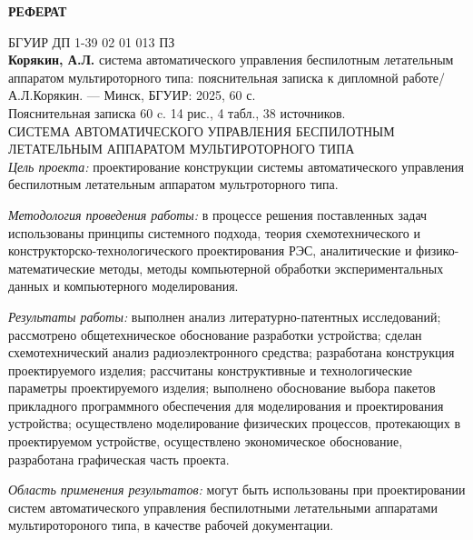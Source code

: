 \thispagestyle{empty} %

\begin{center}  
\textbf{РЕФЕРАТ}
\end{center}

БГУИР ДП 1-39 02 01 013 ПЗ
\\[14pt]
\textbf{Корякин, А.Л.} система автоматического управления
беспилотным летательным аппаратом мультироторного типа:
пояснительная записка к дипломной работе/А.Л.Корякин.
— Минск, БГУИР: 2025, 60 с.
\\[14pt]
Пояснительная записка 60 c. 14 рис., 4 табл., 38 источников.
\\[14pt]
СИСТЕМА АВТОМАТИЧЕСКОГО УПРАВЛЕНИЯ БЕСПИЛОТНЫМ ЛЕТАТЕЛЬНЫМ АППАРАТОМ
МУЛЬТИРОТОРНОГО ТИПА
\\[14pt]
\textit{Цель проекта:} проектирование конструкции
системы автоматического управления беспилотным летательным аппаратом
мультроторного типа.

\textit{Методология проведения работы:}
в процессе решения поставленных задач использованы принципы системного
подхода, теория схемотехнического и конструкторско-технологического
проектирования РЭС, аналитические и физико-математические методы,
методы компьютерной обработки экспериментальных данных и компьютерного
моделирования.

\textit{Результаты работы:}
выполнен анализ литературно-патентных исследований; рассмотрено
общетехническое обоснование разработки устройства; сделан
схемотехнический анализ радиоэлектронного средства; разработана
конструкция проектируемого изделия; рассчитаны конструктивные и
технологические параметры проектируемого изделия; выполнено
обоснование выбора пакетов прикладного программного обеспечения для
моделирования и проектирования устройства; осуществлено моделирование
физических процессов, протекающих в проектируемом устройстве,
осуществлено экономическое обоснование, разработана графическая часть
проекта.

\textit{Область применения результатов:} могут быть использованы при
проектировании систем автоматического управления беспилотными
летательными аппаратами мультиротороного типа, в качестве рабочей
документации.

\newpage
